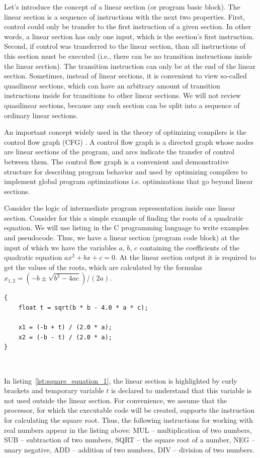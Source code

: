 \documentclass[
11pt,%
tightenlines,%
twoside,%
onecolumn,%
nofloats,%
nobibnotes,%
nofootinbib,%
superscriptaddress,%
noshowpacs,%
centertags]%
{revtex4}
\begin{document}
Let's introduce the concept of a linear section (or program basic block).
The linear section is a sequence of instructions with the next two properties.
First, control could only be transfer to the first instruction of a given section.
In other words, a linear section has only one input, which is the section's first  instruction.
Second, if control was transferred to the linear section, than all instructions of this section must be executed (i.e., there can be no transition instructions inside the linear section).
The transition instruction can only be at the end of the linear section.
Sometimes, instead of linear sections, it is convenient to view so-called quasilinear sections, which can have an arbitrary amount of transition instructions inside for transitions to other linear sections.
We will not review quasilinear sections, because any such section can be split into a sequence of ordinary linear sections.

An important concept widely used in the theory of optimizing compilers is the control flow graph (CFG) \cite{Muchnick}.
A control flow graph is a directed graph whose nodes are linear sections of the program, and arcs indicate the transfer of control between them.
The control flow graph is a convenient and demonstrative structure for describing program behavior and used by optimizing compilers to implement global program optimizations i.e. optimizations that go beyond linear sections.

Consider the logic of intermediate program representation inside one linear section.
Consider for this a simple example of finding the roots of a quadratic equation.
We will use listing in the C programming language to write examples and pseudocode.
Thus, we have a linear section (program code block) at the input of which we have the variables $a$, $b$, $c$ containing the coefficients of the quadratic equation $ax^2 + bx + c = 0$.
At the linear section output it is required to get the values of the roots, which are calculated by the formulas $x_{1,2} = (-b \pm \sqrt{b^2 - 4ac})/(2a)$.

\begin{lstlisting}[caption={The code block for calculating the roots of quadratic equation.},label={lst:square_equation_1}]
{
    float t = sqrt(b * b - 4.0 * a * c);
    
    x1 = (-b + t) / (2.0 * a);
    x2 = (-b - t) / (2.0 * a);
}
\end{lstlisting}

\

In listing~\ref{lst:square_equation_1}, the linear section is highlighted by curly brackets and temporary variable $t$ is declared to understand that this variable is not used outside the linear section.
For convenience, we assume that the processor, for which the executable code will be created, supports the instruction for calculating the square root.
Thus, the following instructions for working with real numbers appear in the listing above: MUL -- multiplication of two numbers, SUB -- subtraction of two numbers, SQRT -- the square root of a number, NEG -- unary negative, ADD -- addition of two numbers, DIV -- division of two numbers.
\end{document}
